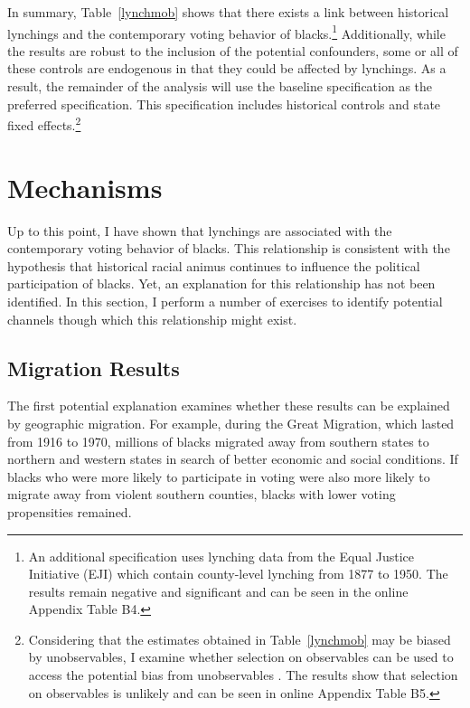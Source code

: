 \documentclass[AEJ, finalmode]{AEA}
\begin{document}
In summary, Table~\ref{lynchmob} shows that there exists a link between historical lynchings and the contemporary voting behavior of blacks.\footnote{An additional specification uses lynching data from the Equal Justice Initiative (EJI) which contain county-level lynching from 1877 to 1950. The results remain negative and significant and can be seen in the online Appendix Table B4.} Additionally, while the results are robust to the inclusion of the potential confounders, some or all of these controls are endogenous in that they could be affected by lynchings. As a result, the remainder of the analysis will use the baseline specification as the preferred specification. This specification includes historical controls and state fixed effects.\footnote{Considering that the estimates obtained in Table~\ref{lynchmob} may be biased by unobservables, I examine whether selection on observables can be used to access the potential bias from unobservables \cite{altonji2005selection,oster2017unobservable}. The results show that selection on observables is unlikely and can be seen in online Appendix Table B5.} 


\section{Mechanisms}

Up to this point, I have shown that lynchings are associated with the contemporary voting behavior of blacks. This relationship is consistent with the hypothesis that historical racial animus continues to influence the political participation of blacks. Yet, an explanation for this relationship has not been identified. In this section, I perform a number of exercises to identify potential channels though which this relationship might exist. 

\subsection{Migration Results}

The first potential explanation examines whether these results can be explained by geographic migration. For example, during the Great Migration, which lasted from 1916 to 1970, millions of blacks migrated away from southern states to northern and western states in search of better economic and social conditions. If blacks who were more likely to participate in voting were also more likely to migrate away from violent southern counties, blacks with lower voting propensities remained.
\end{document}
